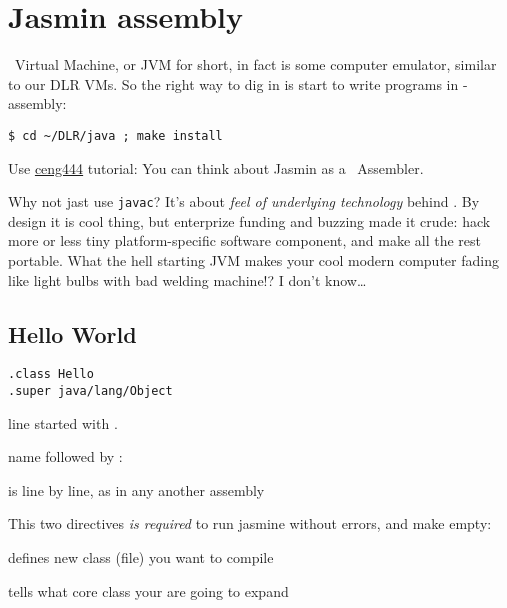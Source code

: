 \section{Jasmin assembly}

\noindent
\J\ Virtual Machine, or JVM for short, in fact is some computer emulator,
similar to our DLR VMs. So the right way to dig in is start to write programs in
\J-assembly:

\begin{lstlisting}
$ cd ~/DLR/java ; make install
\end{lstlisting}
Use
\href{http://saksagan.ceng.metu.edu.tr/courses/ceng444/link/f3jasmintutorial.html}{ceng444} tutorial:
You can think about Jasmin as a \J\ Assembler.

\medskip\noindent
Why not jast use \verb|javac|? It's about \emph{feel of underlying technology}
behind \J. By design it is cool thing, but enterprize funding and buzzing made
it crude: hack more or less tiny platform-specific software component, and make
all the rest portable. What the hell starting JVM makes your cool modern
computer fading like light bulbs with bad welding machine!? I don't know\ldots

\clearpage
\subsection{Hello World}

\begin{lstlisting}
.class Hello
.super java/lang/Object
\end{lstlisting}

\begin{description}[nosep]
\item[directive] line started with .
\item[label] name followed by :
\item[instruction] is line by line, as in any another assembly
\end{description}

\medskip\noindent This two directives \emph{is required} to run jasmine without
errors, and make empty:
\begin{description}[nosep]
\item[.class] defines new class (file) you want to compile
\item[.super] tells what core class your are going to expand
\end{description}



